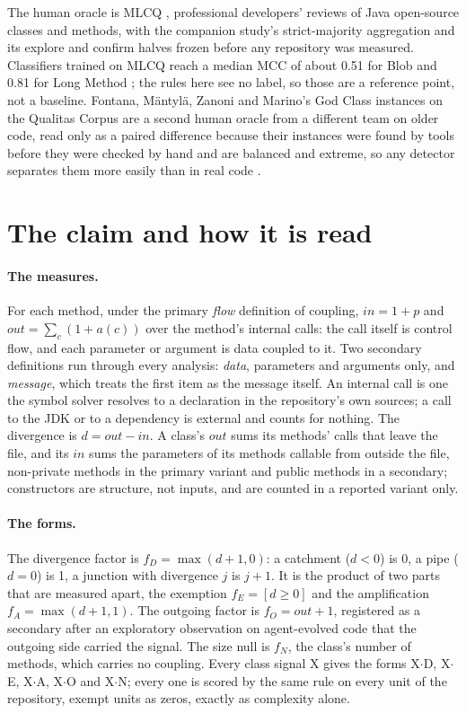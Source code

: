 \documentclass[11pt,a4paper]{article}
\begin{document}
The human oracle is MLCQ \cite{mlcq2020}, professional developers' reviews
of Java open-source classes and methods, with the companion study's
strict-majority aggregation and its explore and confirm halves frozen before
any repository was measured. Classifiers trained on MLCQ reach a median MCC
of about 0.51 for Blob and 0.81 for Long Method \cite{mlcq2023}; the rules
here see no label, so those are a reference point, not a baseline. Fontana,
M\"antyl\"a, Zanoni and Marino's God Class instances on the Qualitas Corpus
\cite{fontana2016, tempero2010} are a second human oracle from a different
team on older code, read only as a paired difference because their
instances were found by tools before they were checked by hand and are
balanced and extreme, so any detector separates them more easily than in
real code \cite{dinucci2018}.

\section{The claim and how it is read}
\label{sec:claim}

\paragraph{The measures.} For each method, under the primary \emph{flow}
definition of coupling, $\mathit{in} = 1 + p$ and $\mathit{out} = \sum_c
(1 + a(c))$ over the method's internal calls: the call itself is control
flow, and each parameter or argument is data coupled to it. Two secondary
definitions run through every analysis: \emph{data}, parameters and
arguments only, and \emph{message}, which treats the first item as the
message itself. An internal call is one the symbol solver resolves to a
declaration in the repository's own sources; a call to the JDK or to a
dependency is external and counts for nothing. The divergence is $d =
\mathit{out} - \mathit{in}$. A class's $\mathit{out}$ sums its methods'
calls that leave the file, and its $\mathit{in}$ sums the parameters of its
methods callable from outside the file, non-private methods in the primary
variant and public methods in a secondary; constructors are structure, not
inputs, and are counted in a reported variant only.

\paragraph{The forms.} The divergence factor is $f_D = \max(d + 1, 0)$:
a catchment ($d < 0$) is 0, a pipe ($d = 0$) is 1, a junction with
divergence $j$ is $j + 1$. It is the product of two parts that are
measured apart, the exemption $f_E = [d \geq 0]$ and the amplification
$f_A = \max(d + 1, 1)$. The outgoing factor is $f_O = \mathit{out} + 1$,
registered as a secondary after an exploratory observation on agent-evolved
code that the outgoing side carried the signal. The size null is $f_N$,
the class's number of methods, which carries no coupling. Every class signal
X gives the forms X$\cdot$D, X$\cdot$E, X$\cdot$A, X$\cdot$O and
X$\cdot$N; every one is scored by the same rule on every unit of the
repository, exempt units as zeros, exactly as complexity alone.
\end{document}
